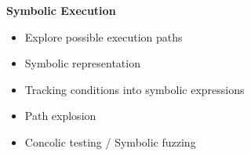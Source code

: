 \begin{frame}
	\begin{columns}[t]
		\begin{column}{0.4\textwidth}
			\textbf{Symbolic Execution}
			\small
			\begin{itemize}
				\item Explore possible execution paths
				\item Symbolic representation
				\item Tracking conditions into symbolic expressions
				\item Path explosion
				\item Concolic testing / Symbolic fuzzing
			\end{itemize}
		\end{column}
	\end{columns}
\end{frame}
